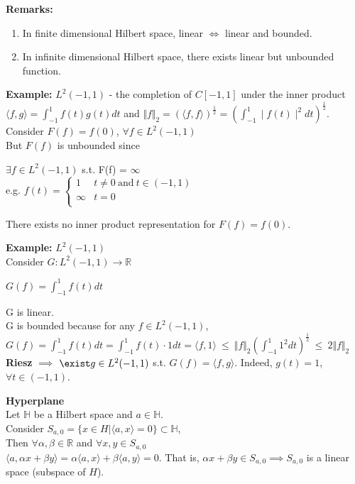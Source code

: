 \documentclass{article}
\begin{document}
\bigbreak

\textbf{Remarks:} 
\begin{enumerate}
    \item In finite dimensional Hilbert space, linear $\iff$ linear and bounded.
    \item In infinite dimensional Hilbert space, there exists linear but unbounded function. 
\end{enumerate}

\pagebreak 


\textbf{Example:} $L^2(-1,1)$ - the completion of $C[-1,1]$ under the inner product $\langle f,g\rangle  = \int_{-1}^{1} f(t)g(t) dt$ and $\Vert f \Vert_2 = (\langle f,f\rangle )^\frac{1}{2} = (\int_{-1}^{1} \mid{f(t)}\mid^2 dt)^\frac{1}{2}$. Consider $F(f) = f(0)$, $\forall f \in L^2(-1,1)$ \\
But $F(f)$ is unbounded since 
\begin{center}
    $\exists f \in L^2(-1,1)$ s.t. F(f) = $\infty$ \\
    \bigbreak
    e.g. $f(t) =  \begin{cases} 
      1 & t\neq 0 \ \text{and} \  t \in (-1,1) \\
      \infty & t = 0 \\
   \end{cases}$ 
\end{center}
There exists no inner product representation for $F(f) = f(0)$.

\bigbreak
\textbf{Example:} $L^2(-1,1)$ \\
Consider $G: L^2(-1,1) \to \mathbb{R}$ \\
\begin{center}
    $G(f) = \int_{-1}^{1} f(t) dt$
\end{center}
G is linear. \\
G is bounded because for any $f \in L^2(-1,1)$, $G(f) = \int_{-1}^{1} f(t) dt = \int_{-1}^{1} f(t) \cdot 1 dt = \langle f, 1\rangle   \ \leq \ \Vert f \Vert_2 (\int_{-1}^{1} 1^2 dt)^\frac{1}{2} \ \leq \ 2\Vert f \Vert_2$  \\

\textbf{Riesz} $\implies$ $\exist g \in L^2(-1,1)$ s.t. $G(f) = \langle f,g\rangle $. Indeed, $g(t) = 1$, $\forall t \in (-1,1)$.


\bigbreak

\textbf{Hyperplane} \\
Let $\mathbb{H}$ be a Hilbert space and $a \in \mathbb{H}$. \\
Consider $S_{a,0} = \{x \in H | \langle a,x\rangle  = 0\} \subset \mathbb{H}$, \\
Then $\forall \alpha, \beta \in \mathbb{R}$ and $\forall x,y \in S_{a,0}$ \\
$\langle a, \alpha x + \beta y\rangle  = \alpha\langle a,x\rangle  + \beta\langle a,y\rangle  = 0$. That is, $\alpha x + \beta y \in S_{a,0} \implies S_{a,0}$ is a linear space (subspace of $H$). 
\end{document}
